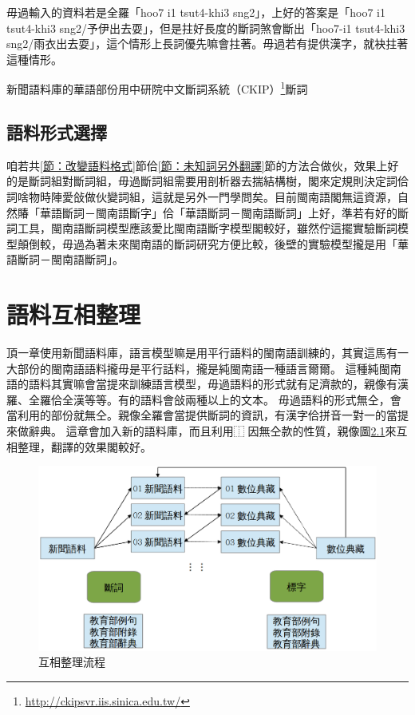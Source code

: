 \documentclass[final,oneside,onecolumn,12pt,a4paper]{book}%
\begin{document}
毋過輸入的資料若是全羅「hoo7 i1 tsut4-khi3 sng2」，上好的答案是「hoo7 i1 tsut4-khi3 sng2/予伊出去耍」，但是拄好長度的斷詞煞會斷出「hoo7-i1 tsut4-khi3 sng2/雨衣出去耍」，這个情形上長詞優先嘛會拄著。毋過若有提供漢字，就袂拄著這種情形。

新聞語料庫的華語部份用中研院中文斷詞系統（CKIP）\footnote{\url{http://ckipsvr.iis.sinica.edu.tw/}}斷詞

\section{語料形式選擇}
\label{節：語料形式選擇}
咱若共\ref{節：改變語料格式}節佮\ref{節：未知詞另外翻譯}節的方法合做伙，效果上好的是斷詞組對斷詞組，毋過斷詞組需要用剖析器去揣結構樹，閣來定規則決定詞佮詞啥物時陣愛敆做伙變詞組，這就是另外一門學問矣。目前閩南語閣無這資源，自然賰「華語斷詞－閩南語斷字」佮「華語斷詞－閩南語斷詞」上好，準若有好的斷詞工具，閩南語斷詞模型應該愛比閩南語斷字模型閣較好，雖然佇這擺實驗斷詞模型顛倒較，毋過為著未來閩南語的斷詞研究方便比較，後壁的實驗模型攏是用「華語斷詞－閩南語斷詞」。

\chapter{語料互相整理}
\label{章：摻猶未整理語料}
頂一章使用新聞語料庫，語言模型嘛是用平行語料的閩南語訓練的，其實這馬有一大部份的閩南語語料攏毋是平行話料，攏是純閩南語一種語言爾爾。
這種純閩南語的語料其實嘛會當提來訓練語言模型，毋過語料的形式就有足濟款的，親像有漢羅、全羅佮全漢等等。有的語料會敆兩種以上的文本。
毋過語料的形式無仝，會當利用的部份就無仝。親像全羅會當提供斷詞的資訊，有漢字佮拼音一對一的當提來做辭典。
這章會加入新的語料庫，而且利用⿰因無仝款的性質，親像圖\ref{圖：互相整理架構}來互相整理，翻譯的效果閣較好。

\begin{figure}
\centerline{\includegraphics[keepaspectratio,width=40em]{圖/互相整理架構}}
\caption{互相整理流程}
\label{圖：互相整理架構}
\end{figure}
\end{document}
